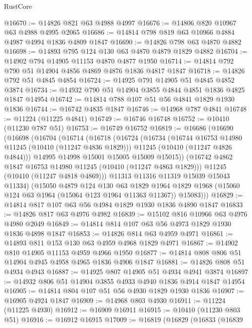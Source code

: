 \begin{lexlean}{RustCore}
\begin{coremodule}
@16670 := @14826 @821 @63 @4988 @4997
@16676 := @14806 @820 @10967 @63 @4988 @4995 @2065
@16686 := @14814 @798 @819 @63 @10966 @4884 @4987 @4994 @1836 @4809 @1847
@16690 := @14826 @798 @63 @4870 @4882
@16698 := @14893 @795 @124 @130 @63 @4870 @4879 @1829 @4882
@16704 := @14902 @794 @14905 @11153 @4870 @4877 @1950
@16714 := @14814 @792 @790 @51 @14904 @4856 @4869 @4876 @1836 @4817 @1847
@16718 := @14826 @792 @51 @4845 @4854
@16724 := @14925 @791 @14905 @51 @4845 @4852 @3874
@16734 := @14932 @790 @51 @14904 @3855 @4844 @4851 @1836 @4825 @1847 @14954
@16742 := @14814 @788 @107 @51 @56 @4841 @1829 @1930 @1836
@16744 := @16742 @4835 @1847
@16746 := @14968 @787 @4841
@16748 := @11224 (@11225 @4841)
@16749 := @16746 @16748
@16752 := @10410 (@11230 @787 @51)
@16753 := @16749 @16752
@16819 := @16686
    (@16690
      (@16698
        (@16704
          (@16714
            (@16718
              (@16724
                (@16734
                  (@16744 @16753 @14980 @11245 (@10410 (@11247 @4836 @1829)))
                  @11245
                  (@10410 (@11247 @4826 @4844)))
                @14995
                @14998
                @15001
                @15005
                @15009
                @15015))
            (@16742 @4862 @1847 @16753 @14980 @11245 (@10410 (@11247 @4863 @1829)))
            @11245
            (@10410 (@11247 @4818 @4869)))
          @11313
          @11316
          @11319
          @15039
          @15043
          @11334)
        (@15050
          @4879
          @124
          @130
          @63
          @1829
          @1964
          @1829
          @1968
          (@15060 @124 @63 @1964 (@15064 @123 @1964 @11363 @11367))
          @15083)))
@16829 := @14814 @817 @107 @63 @56 @4984 @1829 @1930 @1836 @4890 @1847
@16833 := @14826 @817 @63 @4976 @4982
@16839 := @15102 @816 @10966 @63 @4976 @4980 @2049
@16849 := @14814 @814 @107 @63 @56 @4973 @1829 @1930 @1836 @4898 @1847
@16853 := @14826 @814 @63 @4959 @4971
@16861 := @14893 @811 @153 @130 @63 @4959 @4968 @1829 @4971
@16867 := @14902 @810 @14905 @11153 @4959 @4966 @1950
@16877 := @14814 @808 @806 @51 @14904 @4945 @4958 @4965 @1836 @4906 @1847
@16881 := @14826 @808 @51 @4934 @4943
@16887 := @14925 @807 @14905 @51 @4934 @4941 @3874
@16897 := @14932 @806 @51 @14904 @3855 @4933 @4940 @1836 @4914 @1847 @14954
@16905 := @14814 @804 @107 @51 @56 @4930 @1829 @1930 @1836
@16907 := @16905 @4924 @1847
@16909 := @14968 @803 @4930
@16911 := @11224 (@11225 @4930)
@16912 := @16909 @16911
@16915 := @10410 (@11230 @803 @51)
@16916 := @16912 @16915
@17009 := @16819
    (@16829
      (@16833
        (@16839

\end{coremodule}
\end{lexlean}

